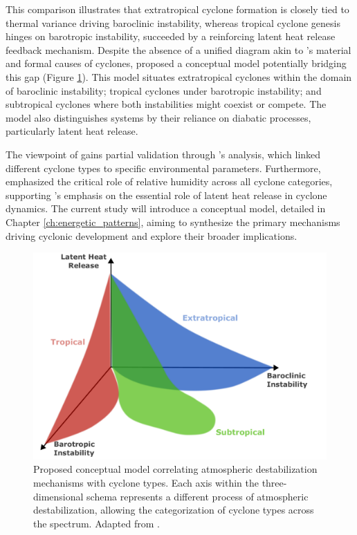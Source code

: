 This comparison illustrates that extratropical cyclone formation is closely tied to thermal variance driving baroclinic instability, whereas tropical cyclone genesis hinges on barotropic instability, succeeded by a reinforcing latent heat release feedback mechanism. Despite the absence of a unified diagram akin to \citet{hart2003cyclone}'s material and formal causes of cyclones, \citet{silva_dias_catarina_2004} proposed a conceptual model potentially bridging this gap (Figure \ref{concecputal_view_instabilities}). This model situates extratropical cyclones within the domain of baroclinic instability; tropical cyclones under barotropic instability; and subtropical cyclones where both instabilities might coexist or compete. The model also distinguishes systems by their reliance on diabatic processes, particularly latent heat release. 

The viewpoint of \citet{silva_dias_catarina_2004} gains partial validation through \citet{yanase2014parameter}'s analysis, which linked different cyclone types to specific environmental parameters. Furthermore, \citet{yanase2014parameter} emphasized the critical role of relative humidity across all cyclone categories, supporting \citet{silva_dias_catarina_2004}'s emphasis on the essential role of latent heat release in cyclone dynamics. The current study will introduce a conceptual model, detailed in Chapter \ref{ch:energetic_patterns}, aiming to synthesize the primary mechanisms driving cyclonic development and explore their broader implications.


\begin{figure}[h!]
\begin{center}
\setcaptionmargin{1cm}
\includegraphics[width=0.9\columnwidth,angle=0]{fig/instabilities_cyclones_types.pdf}
\caption[Conceptual Model: Instabilities and Types of Cyclones]{Proposed conceptual model correlating atmospheric destabilization mechanisms with cyclone types. Each axis within the three-dimensional schema represents a different process of atmospheric destabilization, allowing the categorization of cyclone types across the spectrum. Adapted from \citet{silva_dias_catarina_2004}.}
\label{concecputal_view_instabilities}
\end{center}
\end{figure}


